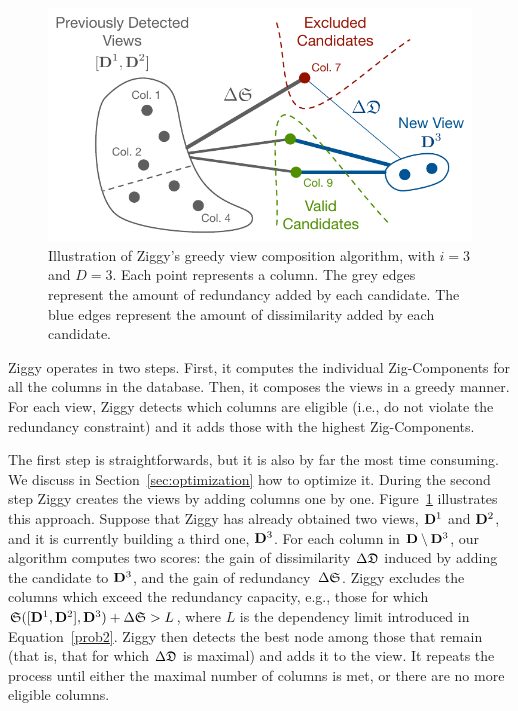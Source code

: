 \begin{figure}
  \centering
  \includegraphics[width=\columnwidth]{Figures/Greedy}
  \caption{Illustration of Ziggy's greedy view composition algorithm, with
      $i=3$
  and $D=3$. Each point represents a column. The grey edges represent the
  amount of redundancy added by each candidate. The blue edges represent the
  amount of dissimilarity added by each candidate.}
  \label{pic:greedy}
\end{figure}
Ziggy operates in two steps. First, it computes the individual Zig-Components
for all the columns in the database. Then, it composes the views in a  greedy
manner. For each view, Ziggy detects which columns are eligible (i.e., do not
violate the redundancy constraint) and it adds those with the highest
Zig-Components.

The first step is straightforwards, but it is also by far the most time
consuming. We discuss in Section~\ref{sec:optimization} how to optimize it.
During the second step Ziggy creates the views by adding columns one by one.
Figure~\ref{pic:greedy} illustrates this approach. Suppose that Ziggy has
already obtained two views, $\mathbf{D}^1$ and $\mathbf{D}^2$, and it is currently
building a third one, $\mathbf{D}^3$. For each column in $\mathbf{D} \setminus \mathbf{D}^3
$, our algorithm computes two scores: the gain of dissimilarity $\Delta\mathfrak{D}$
induced by adding the candidate to $\mathbf{D}^3$, and the gain of
redundancy~$\Delta\mathfrak{S}$. Ziggy excludes the columns which exceed the
redundancy capacity, e.g., those for which $\mathfrak{S}([\mathbf{D}^1, \mathbf{D}^2],
\mathbf{D}^3) + \Delta\mathfrak{S} > L$, where $L$ is the dependency limit introduced in
Equation~\ref{prob2}. Ziggy then detects the best node among those that
remain (that is, that for which $\Delta\mathfrak{D}$ is maximal) and adds it to the
view. It repeats the process until either the maximal number of columns is met, or
there are no more eligible columns.

